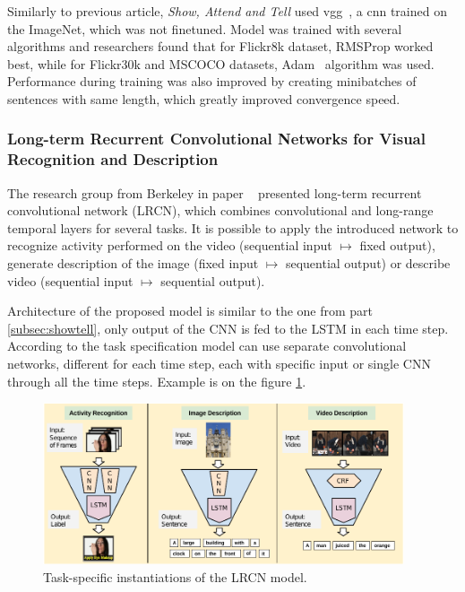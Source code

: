 Similarly to previous article, \emph{Show, Attend and Tell} used \gls{vgg}~\cite{DBLP:journals/corr/SimonyanZ14a}, a \gls{cnn} trained on the ImageNet, which was not finetuned. Model was trained with several algorithms and researchers found that for Flickr8k dataset, RMSProp worked best, while for Flickr30k and MSCOCO datasets, Adam~\cite{DBLP:journals/corr/KingmaB14} algorithm was used. Performance during training was also improved by creating minibatches of sentences with same length, which greatly improved convergence speed.

\subsubsection{Long-term Recurrent Convolutional Networks for Visual Recognition and Description}

The research group from Berkeley in paper ~\cite{DBLP:journals/corr/DonahueHGRVSD14} presented long-term recurrent convolutional network (LRCN), which combines convolutional and long-range temporal layers for several tasks. It is possible to apply the introduced network to recognize activity performed on the video (sequential input $ \mapsto $ fixed output), generate description  of the image (fixed input $ \mapsto $ sequential output) or describe video (sequential input $ \mapsto $ sequential output).

Architecture of the proposed model is similar to the one from part \ref{subsec:showtell}, only output of the CNN is fed to the LSTM in each time step. According to the task specification model can use separate convolutional networks, different for each time step, each with specific input or single CNN through all the time steps. Example is on the figure \ref{fig:LRCN}.

\begin{figure}[!t]
	\centering
	\includegraphics[width=0.95\textwidth]{./fig/long-term-rec-con.pdf}
	\caption{Task-specific instantiations of the LRCN model.~\cite{DBLP:journals/corr/DonahueHGRVSD14}
		\label{fig:LRCN}}
\end{figure}

